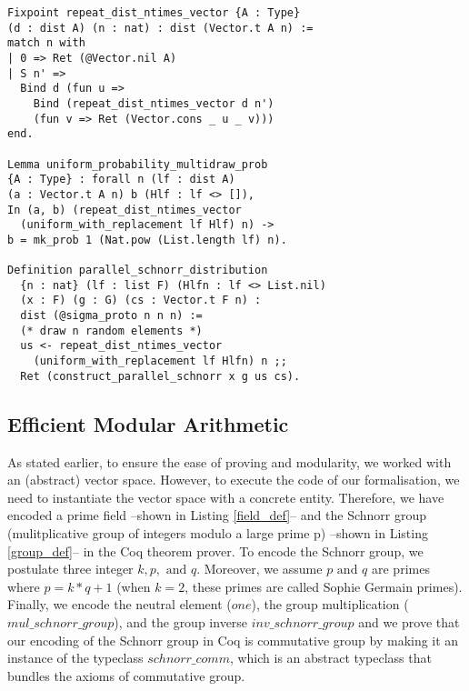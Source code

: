 \documentclass[conference,compsoc]{IEEEtran}
\begin{document}
\begin{lstlisting}[frame=single, language=Coq, caption={Composition of a Distribution},
label={dist_comp},captionpos=t, basicstyle=\ttfamily\footnotesize,
abovecaptionskip=-\medskipamount]
Fixpoint repeat_dist_ntimes_vector {A : Type} 
(d : dist A) (n : nat) : dist (Vector.t A n) := 
match n with 
| 0 => Ret (@Vector.nil A)
| S n' => 
  Bind d (fun u => 
    Bind (repeat_dist_ntimes_vector d n')
    (fun v => Ret (Vector.cons _ u _ v)))
end.

Lemma uniform_probability_multidraw_prob 
{A : Type} : forall n (lf : dist A) 
(a : Vector.t A n) b (Hlf : lf <> []), 
In (a, b) (repeat_dist_ntimes_vector 
  (uniform_with_replacement lf Hlf) n) ->
b = mk_prob 1 (Nat.pow (List.length lf) n).

Definition parallel_schnorr_distribution  
  {n : nat} (lf : list F) (Hlfn : lf <> List.nil) 
  (x : F) (g : G) (cs : Vector.t F n) : 
  dist (@sigma_proto n n n) :=
  (* draw n random elements *)
  us <- repeat_dist_ntimes_vector 
    (uniform_with_replacement lf Hlfn) n ;;
  Ret (construct_parallel_schnorr x g us cs).
\end{lstlisting}


\subsection{Efficient Modular Arithmetic}
As stated earlier, to ensure the ease of proving and modularity, 
we worked with an (abstract) vector space. However, to execute the code of 
our formalisation, we need to instantiate the vector space with a concrete entity. 
Therefore, we have encoded a prime field --shown in Listing \ref{field_def}-- 
and the Schnorr group \cite{schnorr1991efficient} (mulitplicative 
group of integers modulo a large prime p) --shown in Listing \ref{group_def}-- in the Coq theorem prover. 
To encode the Schnorr group, we postulate three integer $k, p, \text{ and } q$. 
Moreover, we assume $p \text{ and } q$ are primes where $p = k * q + 1$ (when 
$k = 2$, these primes are called Sophie Germain primes). Finally, 
we encode the neutral element ($one$), the group multiplication ($mul\_schnorr\_group$), 
and the group inverse $inv\_schnorr\_group$ and we prove that our encoding 
of the Schnorr group in Coq is commutative group by making it 
an instance of the typeclass $schnorr\_comm$, which is an abstract typeclass that bundles the axioms 
of commutative group. 
\end{document}
